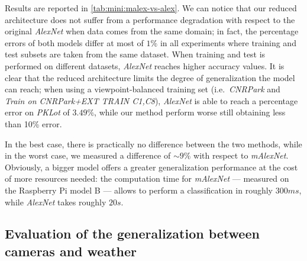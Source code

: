 Results are reported in \ref{tab:mini:malex-vs-alex}.
We can notice that our reduced architecture does not suffer from a performance degradation with respect to the original \emph{AlexNet} when data comes from the same domain;
in fact, the percentage errors of both models differ at most of $1\%$ in all experiments where training and test subsets are taken from the same dataset.
When training and test is performed on different datasets, \emph{AlexNet} reaches higher accuracy values.
It is clear that the reduced architecture limits the degree of generalization the model can reach;
when using a viewpoint-balanced training set (i.e.\ \emph{CNRPark} and \emph{Train on CNRPark+EXT TRAIN C1,C8}), \emph{AlexNet} is able to reach a percentage error on \emph{PKLot} of $3.49\%$, while our method perform worse still obtaining less than 10\% error.

In the best case, there is practically no difference between the two methods, while in the worst case, we measured a difference of $\sim 9\%$ with respect to \emph{mAlexNet}.
Obviously, a bigger model offers a greater generalization performance at the cost of more resources needed:
the computation time for \emph{mAlexNet} --- measured on the Raspberry Pi model B --- allows to perform a classification in roughly $300ms$, while \emph{AlexNet} takes roughly $20s$.

\subsection{Evaluation of the generalization between cameras and weather}


